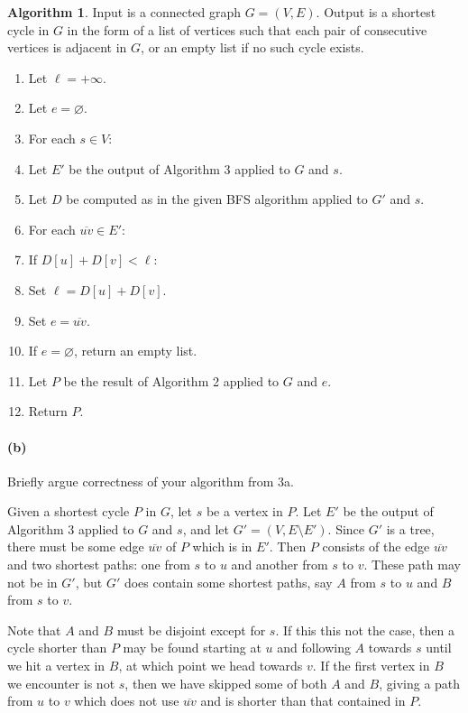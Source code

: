 \documentclass[12pt]{article}
\newlength{\myparskip}
\newenvironment{fullbox}{\begin{lrbox}{\savefullbox}\begin{minipage}{\dimexpr\textwidth-2\fboxsep\relax}\setlength{\parskip}{\myparskip}}{\end{minipage}\end{lrbox}\framebox[\textwidth]{\usebox{\savefullbox}}}
\newenvironment{pbox}[1][]{\begin{fullbox}\def\temp{#1}\ifx\temp\empty\else\paragraph{#1}\phantom{}\fi}{\end{fullbox}}
\theoremstyle{definition}
\newtheorem{algorithm}{Algorithm}
\renewcommand{\emptyset}{\varnothing}
\newcommand{\<}{\langle}
\renewcommand{\>}{\rangle}
\newcommand{\tab}{\hspace{1cm}}
\begin{document}
\begin{algorithm}
    Input is a connected graph $G = (V, E)$.
    Output is a shortest cycle in $G$ in the form of a list of vertices such that each pair of consecutive vertices is adjacent in $G$, or an empty list if no such cycle exists.

    \begin{enumerate}
        \item Let $\ell = +\infty$.
        \item Let $e = \emptyset$.
        \item For each $s \in V$:
        \item \tab Let $E'$ be the output of Algorithm 3 applied to $G$ and $s$.
        \item \tab Let $D$ be computed as in the given BFS algorithm applied to $G'$ and $s$.
        \item \tab For each $\overline{uv} \in E'$:
        \item \tab\tab If $D[u] + D[v] < \ell$:
        \item \tab\tab\tab Set $\ell = D[u] + D[v]$.
        \item \tab\tab\tab Set $e = \overline{uv}$.
        \item If $e = \emptyset$, return an empty list.
        \item Let $P$ be the result of Algorithm 2 applied to $G$ and $e$.
        \item Return $P$.
    \end{enumerate}
\end{algorithm}

\begin{pbox}[(b)]
    Briefly argue correctness of your algorithm from 3a.
\end{pbox}

Given a shortest cycle $P$ in $G$, let $s$ be a vertex in $P$.
Let $E'$ be the output of Algorithm 3 applied to $G$ and $s$, and let $G' = (V, E \setminus E')$.
Since $G'$ is a tree, there must be some edge $\overline{uv}$ of $P$ which is in $E'$.
Then $P$ consists of the edge $\overline{uv}$ and two shortest paths: one from $s$ to $u$ and another from $s$ to $v$.
These path may not be in $G'$, but $G'$ does contain some shortest paths, say $A$ from $s$ to $u$ and $B$ from $s$ to $v$.

Note that $A$ and $B$ must be disjoint except for $s$.
If this this not the case, then a cycle shorter than $P$ may be found starting at $u$ and following $A$ towards $s$ until we hit a vertex in $B$, at which point we head towards $v$.
If the first vertex in $B$ we encounter is not $s$, then we have skipped some of both $A$ and $B$, giving a path from $u$ to $v$ which does not use $\overline{uv}$ and is shorter than that contained in $P$.
\end{document}
